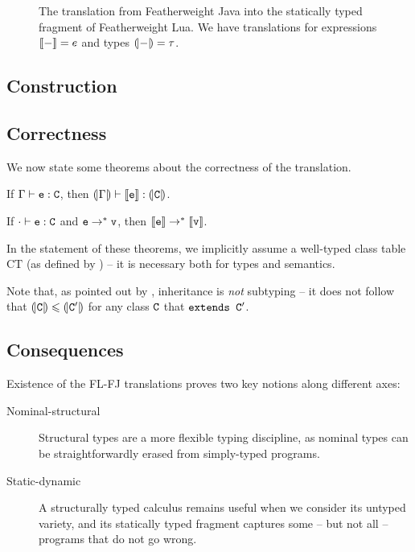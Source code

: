 \begin{figure}
    \centering
    
    \caption{The translation from Featherweight Java into the statically typed fragment of Featherweight Lua. We have translations for expressions $\denot{-} = e$ and types $\denoty{-} = \tau$.}
    \label{fig:translation}
\end{figure}

\subsection{Construction}


\subsection{Correctness}

We now state some theorems about the correctness of the translation.

\begin{theorem}
    If $\Gamma \vdash \texttt{e} : \texttt{C}$, then $\denoty{\Gamma} \vdash \denot{\fj e} : \denoty{\fj C}$. 
\end{theorem}

\begin{theorem}
    If $\cdot \vdash \texttt{e} : \texttt{C}$ and $\texttt{e} \rightarrow^* \texttt{v}$, then $\denot{\fj e} \rightarrow^* \denot{\fj v}$.
\end{theorem}

In the statement of these theorems, we implicitly assume a well-typed class table $\mathrm{CT}$ (as defined by \textcite{featherweight-java}) -- it is necessary both for types and semantics.

Note that, as pointed out by \textcite{inheritance-subtyping}, inheritance is \emph{not} subtyping -- it does not follow that $\denoty{\fj C} \sub \denoty {\fj C'}$ for any class $\texttt{C}$ that $\texttt{extends C}'$.

\subsection{Consequences}

Existence of the FL-FJ translations proves two key notions along different axes: \begin{description}
    \item[Nominal-structural] Structural types are a more flexible typing discipline, as nominal types can be straightforwardly erased from simply-typed programs.
    \item[Static-dynamic] A structurally typed calculus remains useful when we consider its untyped variety, and its statically typed fragment captures some -- but not all -- programs that do not go wrong.
\end{description}

